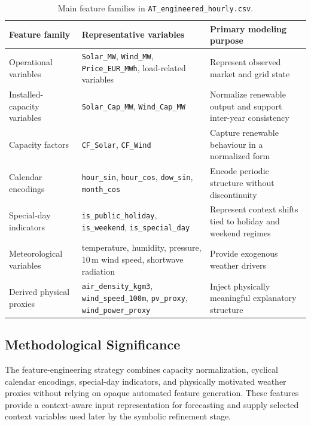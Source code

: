 \begin{table}[H]
	\centering
	\caption{Main feature families in \texttt{AT\_engineered\_hourly.csv}.}
	\label{tab:feature_families_ch52}
	\small
	\begin{tabular}{|p{3.0cm}|p{5.2cm}|p{3.3cm}|}
		\hline
		\textbf{Feature family} & \textbf{Representative variables} & \textbf{Primary modeling purpose} \\
		\hline
		Operational variables & \texttt{Solar\_MW}, \texttt{Wind\_MW}, \texttt{Price\_EUR\_MWh}, load-related variables & Represent observed market and grid state \\
		\hline
		Installed-capacity variables & \texttt{Solar\_Cap\_MW}, \texttt{Wind\_Cap\_MW} & Normalize renewable output and support inter-year consistency \\
		\hline
		Capacity factors & \texttt{CF\_Solar}, \texttt{CF\_Wind} & Capture renewable behaviour in a normalized form \\
		\hline
		Calendar encodings & \texttt{hour\_sin}, \texttt{hour\_cos}, \texttt{dow\_sin}, \texttt{month\_cos} & Encode periodic structure without discontinuity \\
		\hline
		Special-day indicators & \texttt{is\_public\_holiday}, \texttt{is\_weekend}, \texttt{is\_special\_day} & Represent context shifts tied to holiday and weekend regimes \\
		\hline
		Meteorological variables & temperature, humidity, pressure, 10\,m wind speed, shortwave radiation & Provide exogenous weather drivers \\
		\hline
		Derived physical proxies & \texttt{air\_density\_kgm3}, \texttt{wind\_speed\_100m}, \texttt{pv\_proxy}, \texttt{wind\_power\_proxy} & Inject physically meaningful explanatory structure \\
		\hline
	\end{tabular}
\end{table}

\subsection{Methodological Significance}

The feature-engineering strategy combines capacity normalization, cyclical calendar encodings, special-day indicators, and physically motivated weather proxies without relying on opaque automated feature generation. These features provide a context-aware input representation for forecasting and supply selected context variables used later by the symbolic refinement stage.


